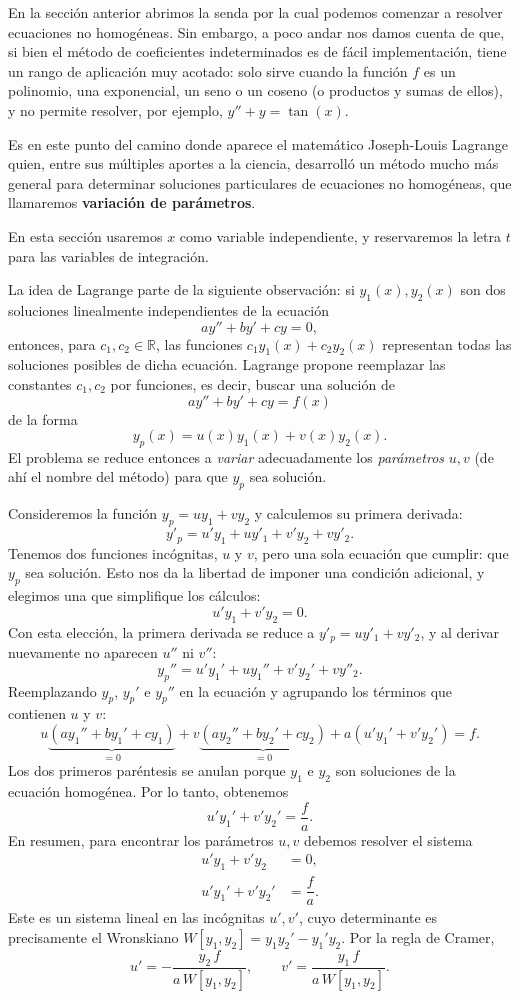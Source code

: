En la secci\'on anterior abrimos la senda por la cual podemos comenzar a resolver ecuaciones no homog\'eneas. Sin embargo, a poco andar nos damos cuenta de que, si bien el m\'etodo de coeficientes indeterminados es de f\'acil implementaci\'on, tiene un rango de aplicaci\'on muy acotado: solo sirve cuando la funci\'on $f$ es un polinomio, una exponencial, un seno o un coseno (o productos y sumas de ellos), y no permite resolver, por ejemplo, $y''+y=\tan(x)$.

Es en este punto del camino donde aparece el matem\'atico Joseph-Louis Lagrange quien, entre sus m\'ultiples aportes a la ciencia, desarroll\'o un m\'etodo mucho m\'as general para determinar soluciones particulares de ecuaciones no homog\'eneas, que llamaremos \textbf{variaci\'on de par\'ametros}.

En esta secci\'on usaremos $x$ como variable independiente, y reservaremos la letra $t$ para las variables de integraci\'on.

La idea de Lagrange parte de la siguiente observaci\'on: si $y_1(x),y_2(x)$ son dos soluciones linealmente independientes de la ecuaci\'on
\[
ay''+by'+cy=0,
\]
entonces, para $c_1,c_2\in \mathbb{R}$, las funciones $c_1y_1(x)+c_2y_2(x)$ representan todas las soluciones posibles de dicha ecuaci\'on. Lagrange propone reemplazar las constantes $c_1,c_2$ por funciones, es decir, buscar una soluci\'on de
\[
ay''+by'+cy=f(x)
\]
de la forma
\[
y_p(x)=u(x)y_1(x)+v(x)y_2(x).
\]
El problema se reduce entonces a \emph{variar} adecuadamente los \emph{par\'ametros} $u,v$ (de ah\'i el nombre del m\'etodo) para que $y_p$ sea soluci\'on.

\begin{remark}
    Consideremos la funci\'on $y_p=uy_1+vy_2$ y calculemos su primera derivada:
    \[
    y'_p=u'y_1+uy'_1+v'y_2+vy'_2.
    \]
    Tenemos dos funciones inc\'ognitas, $u$ y $v$, pero una sola ecuaci\'on que cumplir: que $y_p$ sea soluci\'on. Esto nos da la libertad de imponer una condici\'on adicional, y elegimos una que simplifique los c\'alculos:
    \[
    u'y_1+v'y_2=0.
    \]
    Con esta elecci\'on, la primera derivada se reduce a $y'_p=uy'_1+vy'_2$, y al derivar nuevamente no aparecen $u''$ ni $v''$:
    \[
    y_p''=u'y_1'+uy_1''+v'y_2'+vy''_2.
    \]
    Reemplazando $y_p$, $y_p'$ e $y_p''$ en la ecuaci\'on y agrupando los t\'erminos que contienen $u$ y $v$:
    \[
    u\underbrace{(ay_1''+by_1'+cy_1)}_{=0}+v\underbrace{(ay_2''+by_2'+cy_2)}_{=0}+a\left(u'y_1'+v'y_2'\right)=f.
    \]
    Los dos primeros par\'entesis se anulan porque $y_1$ e $y_2$ son soluciones de la ecuaci\'on homog\'enea. Por lo tanto, obtenemos
    \[
    u'y_1'+v'y_2'=\dfrac{f}{a}.
    \]
    En resumen, para encontrar los par\'ametros $u,v$ debemos resolver el sistema
    \begin{align*}
        u'y_1+v'y_2&=0,\\
        u'y_1'+v'y_2'&=\dfrac{f}{a}.
    \end{align*}
    Este es un sistema lineal en las inc\'ognitas $u',v'$, cuyo determinante es precisamente el Wronskiano $W[y_1,y_2]=y_1y_2'-y_1'y_2$. Por la regla de Cramer,
    \[
    u'=-\dfrac{y_2\,f}{a\,W[y_1,y_2]},\qquad v'=\dfrac{y_1\,f}{a\,W[y_1,y_2]}.
    \]
\end{remark}

